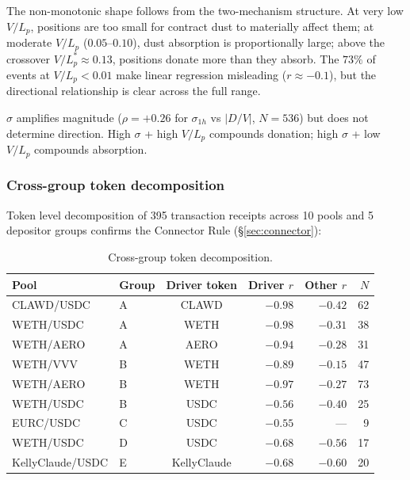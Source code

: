 \documentclass[11pt,a4paper]{article}
\begin{document}
The non-monotonic shape follows from the two-mechanism structure. At very low $V/L_p$, positions are too small for contract dust to materially affect them; at moderate $V/L_p$ ($0.05$--$0.10$), dust absorption is proportionally large; above the crossover $V/L_p^* \approx 0.13$, positions donate more than they absorb. The $73\%$ of events at $V/L_p < 0.01$ make linear regression misleading ($r \approx -0.1$), but the directional relationship is clear across the full range.

$\sigma$ amplifies magnitude ($\rho = +0.26$ for $\sigma_{1h}$ vs $|D/V|$, $N = 536$) but does not determine direction. High $\sigma$ + high $V/L_p$ compounds donation; high $\sigma$ + low $V/L_p$ compounds absorption.

\subsubsection*{Cross-group token decomposition}

Token level decomposition of 395 transaction receipts across 10 pools and 5 depositor groups confirms the Connector Rule (\S\ref{sec:connector}):

\begin{table}[H]
\centering
\caption{Cross-group token decomposition.}\label{tab:cross-group}
\begin{tabular}{@{}llcrrr@{}}
\toprule
Pool & Group & Driver token & Driver $r$ & Other $r$ & $N$ \\
\midrule
CLAWD/USDC          & A & CLAWD       & $-0.98$ & $-0.42$ & 62 \\
WETH/USDC           & A & WETH        & $-0.98$ & $-0.31$ & 38 \\
WETH/AERO           & A & AERO        & $-0.94$ & $-0.28$ & 31 \\
WETH/VVV            & B & WETH        & $-0.89$ & $-0.15$ & 47 \\
WETH/AERO           & B & WETH        & $-0.97$ & $-0.27$ & 73 \\
WETH/USDC           & B & USDC        & $-0.56$           & $-0.40$ & 25 \\
EURC/USDC           & C & USDC        & $-0.55$           & ---     & 9  \\
WETH/USDC           & D & USDC        & $-0.68$ & $-0.56$ & 17 \\
KellyClaude/USDC    & E & KellyClaude & $-0.68$ & $-0.60$ & 20 \\
\bottomrule
\end{tabular}
\end{table}
\end{document}
